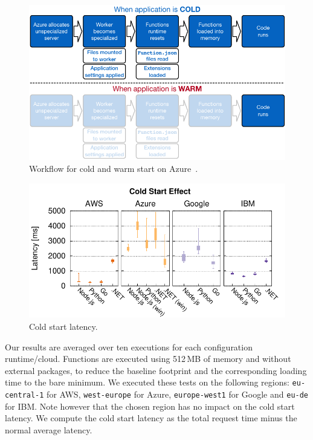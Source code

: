 \begin{figure}[!b]
\centering
\includegraphics[scale=0.6]{bilder/cold-warm}
\caption{Workflow for cold and warm start on Azure~\cite{AzureColdStart}.}
\label{fig:azure_coldstart}
\end{figure}

\begin{figure}[!t]
\centering
\includegraphics[scale=0.7]{bilder/cold_start/coldstart_whisker}
\caption{Cold start latency.}
\label{fig:coldstart_plot}
\end{figure}

Our results are averaged over ten executions for each configuration runtime/cloud. 
Functions are executed using 512\,\gls{MB} of memory and without external packages, to reduce the baseline footprint and the corresponding loading time to the bare minimum.
We executed these tests on the following regions: \texttt{eu-central-1} for AWS, \texttt{west-europe} for Azure,  \texttt{europe-west1} for Google and \texttt{eu-de} for IBM. 
Note however that the chosen region has no impact on the cold start latency. 
We compute the cold start latency as the total request time minus the normal average latency.

